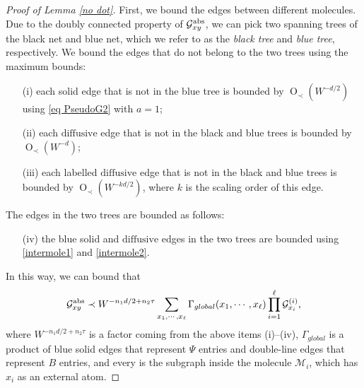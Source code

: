 \documentclass{article}
\newcommand{\1}{\mathds{1}}
\numberwithin{equation}{section}
\newcommand{\be}{\begin{equation}}
\newcommand{\ee}{\end{equation}}
\renewcommand{\cal}{\mathcal}
\newcommand{\dashed}{\text{diffusive}}
\newcommand{\abs}{{\rm abs}}%
\DeclareMathOperator{\OO}{O}
\theoremstyle{plain} %
\theoremstyle{remark}
\begin{document}
\begin{proof} [Proof of Lemma \ref{no dot}]
First, we bound the edges between different molecules. Due to the doubly connected property of $\cal G_{xy}^{\abs}$, we can pick two spanning trees of the black net and blue net, which we refer to as the \emph{black tree} and \emph{blue tree}, respectively. We bound the edges that do  not belong to the two trees using the maximum bounds: 
\begin{itemize}
	\item[(i)] each solid edge that is not in the blue tree is bounded by $\OO_\prec(W^{-d/2})$ using \eqref{eq PseudoG2} with $a=1$; 
	
	\item[(ii)] each $\dashed$ edge that is not in the black and blue trees is bounded by $\OO_\prec(W^{-d})$; 
	
	\item[(iii)] each labelled $\dashed$ edge that is not in the black and blue trees is bounded by $\OO_\prec(W^{-kd/2})$, where $k$ is the scaling order of this edge. 
\end{itemize}
The edges in the two trees are bounded as follows:
\begin{itemize}
	\item[(iv)] the blue solid and $\dashed$ edges in the two trees are bounded using \eqref{intermole1} and \eqref{intermole2}.
\end{itemize}
%	
%	
In this way, we can bound that 
\be\label{reduce Gaux0}
\cal G_{xy}^{\abs}\prec W^{-n_1 d/2 + n_2 \tau}\sum_{x_1, \cdots, x_\ell} \Gamma_{global}(x_1, \cdots, x_\ell) \prod_{i=1}^\ell \cal G_{x_i}^{(i)} ,
\ee
where $W^{-n_1 d/2+ n_2\tau}$ is a factor coming from the above items (i)--(iv), $\Gamma_{global}$ is a product of blue solid edges that represent $\Psi$ entries and double-line edges that represent $B$ entries, and every \smash{$\cal G_{x_i}^{(i)}$} is the subgraph inside the molecule $\cal M_i$, which has $x_i$ as an external atom. 

\end{proof}
\end{document}
